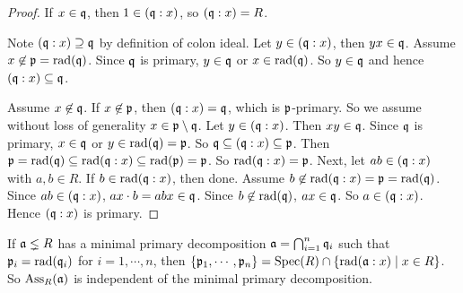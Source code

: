 \begin{proof}
    If $x \in \mathfrak{q}$, then $1 \in (\mathfrak{q}:x)$, so $(\mathfrak{q}:x) = R$. \par
    Note $(\mathfrak{q}:x) \supseteq \mathfrak{q}$ by definition of colon ideal. Let $y \in (\mathfrak{q}:x)$, then $yx \in \mathfrak{q}$. Assume $x \not \in \mathfrak{p} = \operatorname{rad}(\mathfrak{q})$. Since $\mathfrak{q}$ is primary, $y \in \mathfrak{q}$ or $x \in \operatorname{rad}(\mathfrak{q})$. So $y \in \mathfrak{q}$ and hence $(\mathfrak{q}:x) \subseteq \mathfrak{q}$. \par
    Assume $x \not \in \mathfrak{q}$. If $x \not \in \mathfrak{p}$, then $(\mathfrak{q}:x) = \mathfrak{q}$, which is $\mathfrak{p}$-primary. So we assume without loss of generality $x \in \mathfrak{p} \setminus \mathfrak{q}$. Let $y \in (\mathfrak{q}:x)$. Then $xy \in \mathfrak{q}$. Since $\mathfrak{q}$ is primary, $x \in \mathfrak{q}$ or $y \in \operatorname{rad}(\mathfrak{q}) = \mathfrak{p}$. So $\mathfrak{q} \subseteq (\mathfrak{q}:x) \subseteq \mathfrak{p}$. Then $\mathfrak{p} = \operatorname{rad}(\mathfrak{q}) \subseteq \operatorname{rad}(\mathfrak{q}:x) \subseteq \operatorname{rad}(\mathfrak{p}) = \mathfrak{p}$. So $\operatorname{rad}(\mathfrak{q}:x) = \mathfrak{p}$. Next, let $ab \in (\mathfrak{q}:x)$ with $a,b \in R$. If $b \in \operatorname{rad}(\mathfrak{q}:x)$, then done. Assume $b \not \in \operatorname{rad}(\mathfrak{q}:x) = \mathfrak{p} = \operatorname{rad}(\mathfrak{q})$. Since $ab \in (\mathfrak{q}:x)$, $ax \cdot b = abx \in \mathfrak{q}$. Since $b \not \in \operatorname{rad}(\mathfrak{q})$, $ax \in \mathfrak{q}$. So $a \in (\mathfrak{q}:x)$. Hence $(\mathfrak{q}:x)$ is primary.
\end{proof}

\begin{proposition}
    If $\mathfrak{a} \lneq R$ has a minimal primary decomposition $\mathfrak{a} = \bigcap_{i=1}^{n}\mathfrak{q}_i$ such that $\mathfrak{p}_i = \operatorname{rad}(\mathfrak{q}_i)$ for $i = 1,\cdots,n$, then $\{\mathfrak{p}_1,\cdots,\mathfrak{p}_n\} = \operatorname{Spec}(R) \cap \{\operatorname{rad}(\mathfrak{a}:x) \mid x \in R\}$. So $\operatorname{Ass}_R(\mathfrak{a})$ is independent of the minimal primary decomposition. 
\end{proposition}

